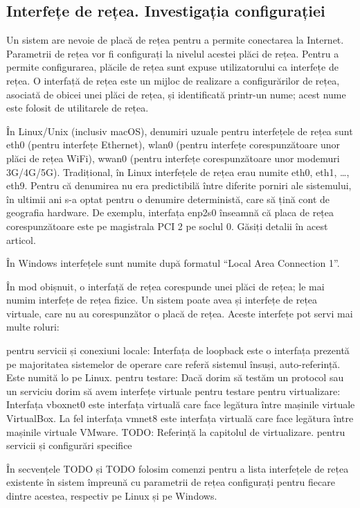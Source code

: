 \subsection{Interfețe de rețea. Investigația configurației}
\label{sec:net:interface}

Un sistem are nevoie de placă de rețea pentru a permite conectarea la Internet. Parametrii de rețea vor fi configurați la nivelul acestei plăci de rețea. Pentru a permite configurarea, plăcile de rețea sunt expuse utilizatorului ca interfețe de rețea. O interfață de rețea este un mijloc de realizare a configurărilor de rețea, asociată de obicei unei plăci de rețea, și identificată printr-un nume; acest nume este folosit de utilitarele de rețea.

În Linux/Unix (inclusiv macOS), denumiri uzuale pentru interfețele de rețea sunt eth0 (pentru interfețe Ethernet), wlan0 (pentru interfețe corespunzătoare unor plăci de rețea WiFi), wwan0 (pentru interfețe corespunzătoare unor modemuri 3G/4G/5G). Tradițional, în Linux interfețele de rețea erau numite eth0, eth1, …, eth9. Pentru că denumirea nu era predictibilă între diferite porniri ale sistemului, în ultimii ani s-a optat pentru o denumire deterministă, care să țină cont de geografia hardware. De exemplu, interfața enp2s0 înseamnă că placa de rețea corespunzătoare este pe magistrala PCI 2 pe soclul 0. Găsiți detalii în acest articol.

În Windows interfețele sunt numite după formatul “Local Area Connection 1”.

În mod obișnuit, o interfață de rețea corespunde unei plăci de rețea; le mai numim interfețe de rețea fizice. Un sistem poate avea și interfețe de rețea virtuale, care nu au corespunzător o placă de rețea. Aceste interfețe pot servi mai multe roluri:

pentru servicii și conexiuni locale: Interfața de loopback este o interfața prezentă pe majoritatea sistemelor de operare care referă sistemul însuși, auto-referință. Este numită lo pe Linux.
pentru testare: Dacă dorim să testăm un protocol sau un serviciu dorim să avem interfețe virtuale pentru testare
pentru virtualizare: Interfața vboxnet0 este interfața virtuală care face legătura între mașinile virtuale VirtualBox. La fel interfața vmnet8 este interfața virtuală care face legătura între mașinile virtuale VMware. TODO: Referință la capitolul de virtualizare.
pentru servicii și configurări specifice

În secvențele TODO și TODO folosim comenzi pentru a lista interfețele de rețea existente în sistem împreună cu parametrii de rețea configurați pentru fiecare dintre acestea, respectiv pe Linux și pe Windows.

